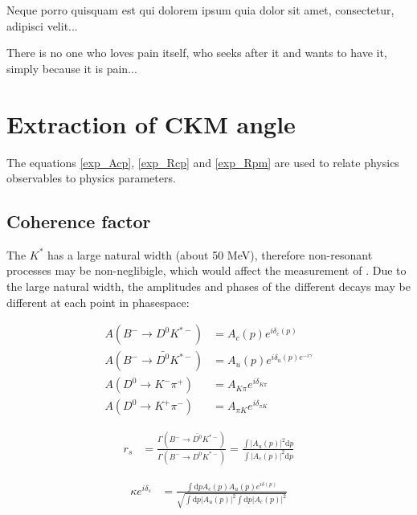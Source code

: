 \clearpage
\begin{savequote}[8cm]
\textlatin{Neque porro quisquam est qui dolorem ipsum quia dolor sit amet, consectetur, adipisci velit...}

There is no one who loves pain itself, who seeks after it and wants to have it, simply because it is pain...
\end{savequote}

\chapter{\label{ch:9-interpretation}Extraction of CKM angle \Pgamma} 

\minitoc

The equations \ref{exp_Acp}, \ref{exp_Rcp} and \ref{exp_Rpm} are used to relate physics observables to physics parameters. 

\section{Coherence factor}
\label{sec:interpretation:coherence}

The $K^*$ has a large natural width (about 50 MeV), therefore non-resonant processes may be non-neglibigle, which would affect the measurement of \Pgamma. Due to the large natural width, the amplitudes and phases of the different decays may be different at each point in phasespace:

\begin{align*}
A(B^- \to D^0 K^{*-}) &= A_c(p) e^{i\delta_c(p)} \\
A(B^- \to \bar{D^0} K^{*-}) &= A_u(p) e^{i\delta_u(p) e^{-i\gamma}} \\
A(D^0 \to K^-\pi^+) &= A_{K\pi} e^{i\delta_{K\pi}} \\
A(D^0 \to K^+\pi^-) &= A_{{\pi}K} e^{i\delta_{{\pi}K}} 
\end{align*}

\begin{align*}
r_s &= \frac{\Gamma(B^- \to \bar{D^0}K^{*-})}{\Gamma(B^- \to D^0K^{*-})} = \frac{\int \left|A_u(p)\right|^2 \mathrm{d}p}{\int \left|A_c(p)\right|^2 \mathrm{d}p}
\end{align*}

\begin{align}
\kappa e^{i\delta_s} &= \frac{\int \mathrm{d}p A_c(p)A_u(p)e^{i\delta(p)}}{\sqrt{\int \mathrm{d}p \left|A_u(p)\right|^2 \int \mathrm{d}p \left|A_c(p)\right|^2}}
\label{kappadefinition}
\end{align}

